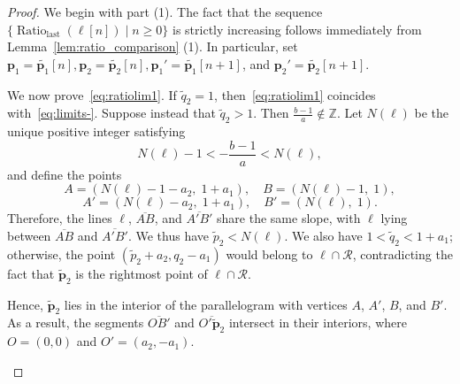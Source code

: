 \documentclass{article}
\theoremstyle{remark}
\begin{document}
\begin{proof}
We begin with part (1). The fact that the sequence $\{\operatorname{Ratio}_{\mathrm{last}}(\ell[n]) \mid n \geq 0\}$ is strictly increasing follows immediately from Lemma~\ref{lem:ratio_comparison} (1). In particular, set $\mathbf{p}_1 = \widetilde{\mathbf{p}_1}[n],\mathbf{p}_2 = \widetilde{\mathbf{p}_2}[n], \mathbf{p}_1' = \widetilde{\mathbf{p}_1}[n+1]$, and $\mathbf{p}_2' = \widetilde{\mathbf{p}_2}[n+1]$.

    We now prove~\eqref{eq:ratiolim1}. 
    If $\widetilde{q}_2 = 1$, then~\eqref{eq:ratiolim1} coincides with~\eqref{eq:limits-}. 
    Suppose instead that $\widetilde{q}_2 > 1$. 
    Then $\frac{b-1}{a}\notin \mathbb Z$. 
    Let $N(\ell)$ be the unique positive integer satisfying 
    \[
        N(\ell) - 1 < -\frac{b-1}{a} < N(\ell),
    \]
    and define the points
    \[
        A = (N(\ell) - 1 - a_2,\; 1 + a_1), \quad B = (N(\ell) - 1,\; 1),
    \]
    \[
        A' = (N(\ell) - a_2,\; 1 + a_1), \quad B' = (N(\ell),\; 1).
    \]
Therefore, the lines $\ell$, $\overline{AB}$, and $\overline{A'B'}$ share the same slope, with $\ell$ lying between $\overline{AB}$ and $\overline{A'B'}$. We thus have $\widetilde p_2<N(\ell)$. We also have $1<\widetilde q_2 < 1 + a_1$; otherwise, the point $(\widetilde p_2 + a_2, q_2 - a_1)$ would belong to $\ell \cap \mathcal R$, contradicting the fact that $\widetilde{\mathbf{p}}_2$ is the rightmost point of $\ell \cap \mathcal R$.

Hence, $\widetilde{\mathbf{p}}_2$ lies in the interior of the parallelogram with vertices $A$, $A'$, $B$, and $B'$. As a result, the segments $\overline{OB'}$ and $\overline{O'\widetilde{\mathbf{p}}_2}$ intersect in their interiors, where $O = (0,0)$ and $O' = (a_2, -a_1)$. 

\begin{center}
\end{center}



\end{proof}
\end{document}
